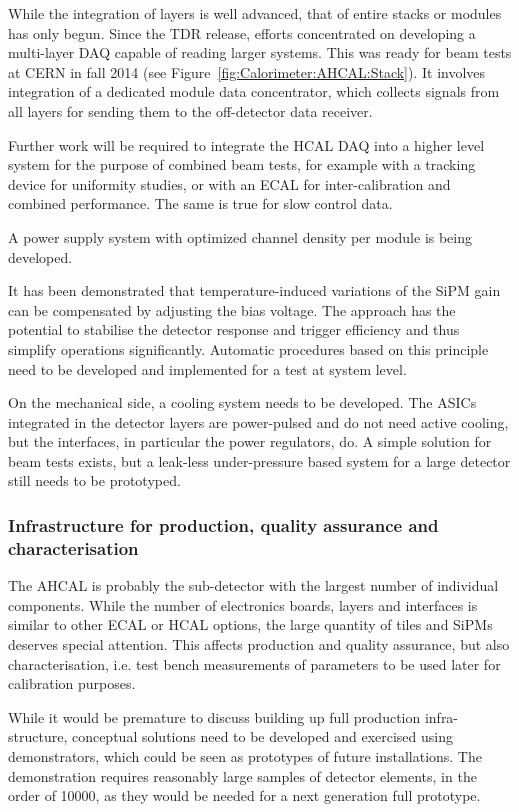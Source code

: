 While the integration of layers is well advanced, that of entire stacks or modules has only begun. Since the TDR release, efforts concentrated on developing a multi-layer DAQ capable of reading larger systems. This was ready for beam tests at CERN in fall 2014 (see Figure~\ref{fig:Calorimeter:AHCAL:Stack}). It involves integration of a dedicated module data concentrator, which collects signals from all layers for sending them to the off-detector data receiver.

Further work will be required to integrate the HCAL DAQ into a higher level system for the purpose of combined beam tests, for example with a tracking device for uniformity studies, or with an ECAL for inter-calibration and combined performance. The same is true for slow control data.

A power supply system with optimized channel density per module is being developed.

It has been demonstrated that temperature-induced variations of the SiPM gain can be compensated by adjusting the bias voltage. The approach has the potential to stabilise the detector response and trigger efficiency and thus simplify operations significantly. Automatic procedures based on this principle need to be developed and implemented for a test at system level.

On the mechanical side, a cooling system needs to be developed. The ASICs integrated in the detector layers are power-pulsed and do not need active cooling, but the interfaces, in particular the power regulators, do. A simple solution for beam tests exists, but a leak-less under-pressure based system for a large detector still needs to be prototyped.

\subsubsection{Infrastructure for production, quality assurance and characterisation}

The AHCAL is probably the sub-detector with the largest number of individual components. While the number of electronics boards, layers and interfaces is similar to other ECAL or HCAL options, the large quantity of tiles and SiPMs deserves special attention. This affects production and quality assurance, but also characterisation, i.e. test bench measurements of parameters to be used later for calibration purposes.

While it would be premature to discuss building up full production infra-structure, conceptual solutions need to be developed and exercised using demonstrators, which could be seen as prototypes of future installations. The demonstration requires reasonably large samples of detector elements, in the order of 10000, as they would be needed for a next generation full prototype.

